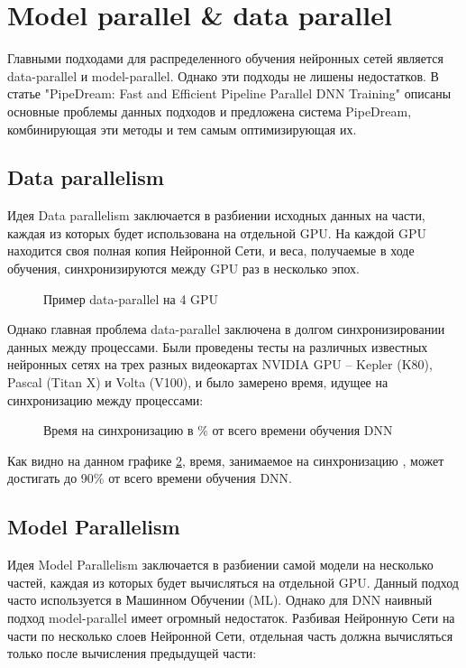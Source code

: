 
\newpage
\section{Model parallel \& data parallel}
Главными подходами для распределенного обучения нейронных сетей является data-parallel и model-parallel. Однако эти подходы не лишены недостатков. В статье "PipeDream: Fast and Efficient Pipeline Parallel DNN Training"\cite{pipedream} описаны основные проблемы данных подходов и предложена система PipeDream, комбинирующая эти методы и тем самым оптимизирующая их.

\subsection{Data parallelism}
Идея Data parallelism заключается в разбиении исходных данных на части, каждая из которых будет использована на отдельной GPU. На каждой GPU находится своя полная копия Нейронной Сети, и веса, получаемые в ходе обучения, синхронизируются между GPU раз в несколько эпох.


\begin{figure}[h]%
	\centering
	\caption{Пример data-parallel на 4 GPU}
	\label{data_parallel} %
\end{figure}


Однако главная проблема data-parallel заключена в долгом синхронизировании данных между процессами. Были проведены тесты на различных известных нейронных сетях на трех разных видеокартах NVIDIA GPU -- Kepler (K80), Pascal (Titan X) и Volta (V100), и было замерено время, идущее на синхронизацию между процессами:

\begin{figure}[h]%
	\centering
	\caption{Время на синхронизацию в \% от всего времени обучения DNN}
	\label{communication_overhead} %
\end{figure}

Как видно на данном графике \ref{communication_overhead}, время, занимаемое на синхронизацию , может достигать до 90\% от всего времени обучения DNN.


\subsection{Model Parallelism}
Идея Model Parallelism заключается в разбиении самой модели на несколько частей, каждая из которых будет вычисляться на отдельной GPU. Данный подход часто используется в Машинном Обучении (ML). Однако для DNN наивный подход model-parallel имеет огромный недостаток. Разбивая Нейронную Сети на части по несколько слоев Нейронной Сети, отдельная часть должна вычисляться только после вычисления предыдущей части:

